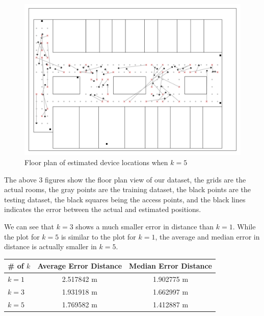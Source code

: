 \documentclass[12pt, conference]{IEEEtran}
\begin{document}
\begin{figure}[htbp]
  \centerline{\includegraphics[width=\columnwidth]{img/Plot-K5FloorPlan-1.png}}
  \caption{Floor plan of estimated device locations when $k=5$}
  \label{fig: K5}
\end{figure}

The above 3 figures show the floor plan view of our dataset, the grids are the actual rooms, the gray points are the training dataset, the black points are the testing dataset, the black squares being the access points, and the black lines indicates the error between the actual and estimated positions.

We can see that $k=3$ shows a much smaller error in distance than $k=1$. While the plot for $k=5$ is similar to the plot for $k=1$, the average and median error in distance is actually smaller in $k=5$.

\begin{table}[htbp]
  \begin{tabular}{|l|c|c|}
  \hline
  # of $k$   & Average Error Distance & Median Error Distance \\ \hline
  $k=1$        & 2.517842 m             & 1.902775 m            \\ \hline
  $k=3$        & 1.931918 m             & 1.662997 m            \\ \hline
  $k=5$        & 1.769582 m             & 1.412887 m            \\ \hline
  \end{tabular}
\end{table}

\end{document}
